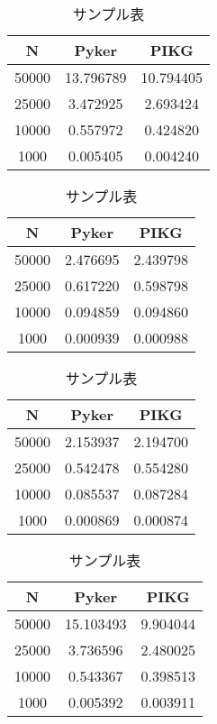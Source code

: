 \documentclass{article}
\begin{document}
\begin{table}[ht]
  \centering %
  \caption{サンプル表} %
  \label{tab:sampleTable4}
  \begin{tabular}{ccc} %
  \toprule
  N & Pyker & PIKG \\
  \midrule
  50000 & 13.796789& 10.794405\\
  25000 & 3.472925 & 2.693424\\
  10000 & 0.557972 & 0.424820\\
  1000 & 0.005405& 0.004240\\
\bottomrule
\end{tabular}
\end{table}



\begin{table}[ht]
  \centering %
  \caption{サンプル表} %
  \label{tab:sampleTable5}
  \begin{tabular}{ccc} %
  \toprule
  N & Pyker & PIKG \\
  \midrule
  50000 & 2.476695 & 2.439798\\
  25000 & 0.617220 & 0.598798\\
  10000 & 0.094859 & 0.094860\\
  1000 & 0.000939& 0.000988\\
\bottomrule
\end{tabular}
\end{table}


\begin{table}[ht]
  \centering %
  \caption{サンプル表} %
  \label{tab:sampleTable6}
  \begin{tabular}{ccc} %
  \toprule
  N & Pyker & PIKG \\
  \midrule
  50000 & 2.153937 & 2.194700\\
  25000 &0.542478 & 0.554280\\
  10000 & 0.085537 &0.087284\\
  1000 & 0.000869&0.000874\\
\bottomrule
\end{tabular}
\end{table}

\begin{table}[ht]
  \centering %
  \caption{サンプル表} %
  \label{tab:sampleTable7}
  \begin{tabular}{ccc} %
  \toprule
  N & Pyker & PIKG \\
  \midrule
  50000 & 15.103493& 9.904044\\
  25000 &3.736596 & 2.480025\\
  10000 &0.543367 &0.398513\\
  1000 & 0.005392&0.003911\\
\bottomrule
\end{tabular}
\end{table}
\end{document}
